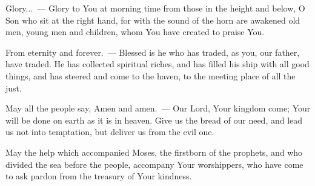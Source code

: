 \documentclass[12pt,twoside,a5paper]{article}
\begin{document}
\begin{halfparskip}
  Glory...~--- Glory to You at morning time from those in the height and below, O Son who sit at the right hand, for with the sound of the horn are awakened old men, young men and children, whom You have created to praise You.

  From eternity and forever.~--- Blessed is he who has traded, as you, our father, have traded. He has collected spiritual riches, and has filled his ship with all good things, and has steered and come to the haven, to the meeting place of all the just.

  May all the people say, Amen and amen.~--- Our Lord, Your kingdom come; Your will be done on earth as it is in heaven. Give us the bread of our need, and lead us not into temptation, but deliver us from the evil one.

  May the help which accompanied Moses, the firstborn of the prophets, and who divided the sea before the people, accompany Your worshippers, who have come to ask pardon from the treasury of Your kindness.
\end{halfparskip}

\end{document}

